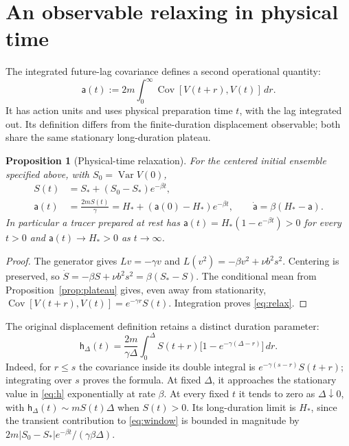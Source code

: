 \documentclass[11pt,a4paper]{article}
\newtheorem{proposition}{Proposition}
\newcommand{\Var}{\operatorname{Var}}
\newcommand{\Cov}{\operatorname{Cov}}
\begin{document}
\section{An observable relaxing in physical time}
The integrated future-lag covariance defines a second operational quantity:
\begin{equation}\label{eq:field}
 \mathsf a(t):=2m\int_0^\infty\Cov[V(t+r),V(t)]\,dr.
\end{equation}
It has action units and uses physical preparation time $t$, with the lag
integrated out. Its definition differs from the finite-duration displacement
observable; both share the same stationary long-duration plateau.

\begin{proposition}[Physical-time relaxation]\label{prop:relax}
For the centered initial ensemble specified above, with $S_0=\Var V(0)$,
\begin{align}
 S(t)&=S_*+(S_0-S_*)e^{-\beta t},\label{eq:variance}\\
 \mathsf a(t)&=\frac{2mS(t)}\gamma
 =H_*+(\mathsf a(0)-H_*)e^{-\beta t},\qquad
 \dot{\mathsf a}=\beta(H_*-\mathsf a).\label{eq:relax}
\end{align}
In particular a tracer prepared at rest has
$\mathsf a(t)=H_*(1-e^{-\beta t})>0$ for every $t>0$ and
$\mathsf a(t)\to H_*>0$ as $t\to\infty$.
\end{proposition}
\begin{proof}
The generator gives $Lv=-\gamma v$ and
$L(v^2)=-\beta v^2+\nu b^2s^2$. Centering is preserved, so
$\dot S=-\beta S+\nu b^2s^2=\beta(S_*-S)$.
The conditional mean from Proposition~\ref{prop:plateau} gives, even away from
stationarity, $\Cov[V(t+r),V(t)]=e^{-\gamma r}S(t)$.
Integration proves \eqref{eq:relax}.
\end{proof}

The original displacement definition retains a distinct duration parameter:
\begin{equation}\label{eq:window}
 \mathsf h_\Delta(t)=\frac{2m}{\gamma\Delta}
 \int_0^\Delta S(t+r)\bigl[1-e^{-\gamma(\Delta-r)}\bigr]\,dr.
\end{equation}
Indeed, for $r\le s$ the covariance inside its double integral is
$e^{-\gamma(s-r)}S(t+r)$; integrating over $s$ proves the formula.
At fixed $\Delta$, it approaches the stationary value in \eqref{eq:h}
exponentially at rate $\beta$. At every fixed $t$ it tends to zero as
$\Delta\downarrow0$, with $\mathsf h_\Delta(t)\sim mS(t)\Delta$ when
$S(t)>0$. Its long-duration limit is $H_*$, since the transient contribution
to \eqref{eq:window} is bounded in magnitude by
$2m|S_0-S_*|e^{-\beta t}/(\gamma\beta\Delta)$.
\end{document}

